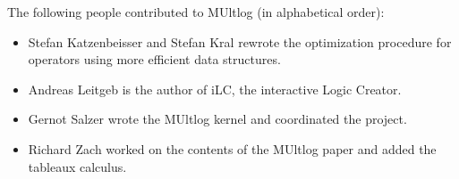 \documentclass[]{article}
\providecommand{\tightlist}{%
  \setlength{\itemsep}{0pt}\setlength{\parskip}{0pt}}
\begin{document}
The following people contributed to MUltlog (in alphabetical order):

\begin{itemize}
\tightlist
\item
  Stefan Katzenbeisser and Stefan Kral rewrote the optimization
  procedure for operators using more efficient data structures.
\item
  Andreas Leitgeb is the author of iLC, the interactive Logic Creator.
\item
  Gernot Salzer wrote the MUltlog kernel and coordinated the project.
\item
  Richard Zach worked on the contents of the MUltlog paper and added the
  tableaux calculus.
\end{itemize}
\end{document}
